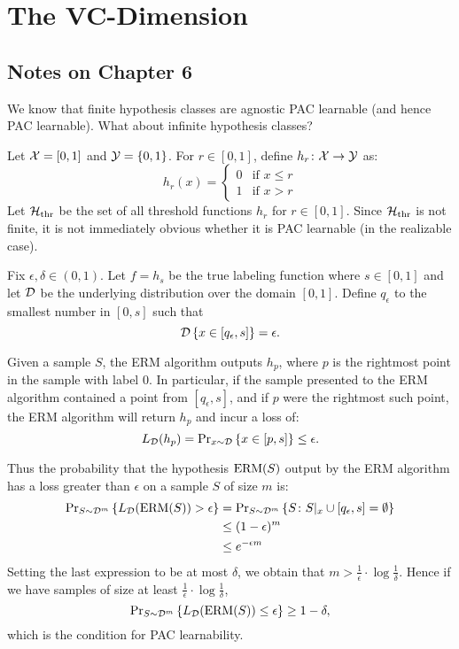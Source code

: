 \chapter{The VC-Dimension}

\section*{Notes on Chapter 6}

We know that finite hypothesis classes are agnostic PAC learnable (and hence
PAC learnable).  What about infinite hypothesis classes? 

\begin{example}
Let $\mathcal{X} = [0, 1]$ and $\mathcal{Y} = \{0, 1\}$. For $r \in [0, 1]$, define 
$h_r \colon \mathcal{X} \rightarrow \mathcal{Y} $ as:
\[
    h_r(x) = \left \{ \begin{array}{ll} 
                        0 & \text{if } x \leq r \\
                        1 & \text{if } x > r
                      \end{array}\right .
\]
Let $\mathcal{H}_{\text{thr}}$ be the set of all threshold functions $h_r$ 
for $r \in [0, 1]$. Since $\mathcal{H}_{\text{thr}}$ is not finite, it is 
not immediately obvious whether it is PAC learnable (in the realizable case). 

Fix $\epsilon, \delta \in (0, 1)$. Let $f = h_s$ be the true labeling function
where $s \in [0, 1]$ and let $\mathcal{D}$ be the underlying distribution over the
domain $[0, 1]$. Define $q_{\epsilon}$ to the smallest number in $[0, s]$ such
that 
\[
    \mathcal{D} \left \{ x \in [q_{\epsilon}, s] \right \} = \epsilon.
\]

Given a sample $S$, the ERM algorithm outputs $h_p$, where $p$ is the rightmost
point in the sample with label $0$.  In particular, if the sample presented to
the ERM algorithm contained a point from $[q_{\epsilon}, s]$, and if $p$ were the
rightmost such point, the ERM algorithm will return $h_p$ and incur a loss of:
\[
    L_{\mathcal{D}}(h_p) = \text{Pr}_{x \sim \mathcal{D}} \left \{ x \in [p, s] \right \} \leq \epsilon.
\]  

Thus the probability that the hypothesis $\operatorname{ERM}(S)$ output by the ERM algorithm 
has a loss greater than $\epsilon$ on a sample $S$ of size $m$ is:
\begin{align*}
    \text{Pr}_{S \sim \mathcal{D}^m} \left \{ L_{\mathcal{D}} (\operatorname{ERM}(S)) > \epsilon \right \} 
     & = \text{Pr}_{S \sim \mathcal{D}^m} \left \{ S \colon S|_x \cup [q_{\epsilon}, s] = \emptyset \right \} \\     & \leq (1 - \epsilon)^m \\
     & \leq e^{- \epsilon m}
\end{align*}
Setting the last expression to be at most $\delta$, we obtain that 
$m > \frac{1}{\epsilon} \cdot \log \frac{1}{\delta}$. Hence if we have samples 
of size at least $\frac{1}{\epsilon} \cdot \log \frac{1}{\delta}$, 
\[
    \text{Pr}_{S \sim \mathcal{D}^m} \left \{ L_{\mathcal{D}} (\operatorname{ERM}(S)) \leq \epsilon \right \} \geq 1 - \delta, 
\]
which is the condition for PAC learnability.
\end{example}



